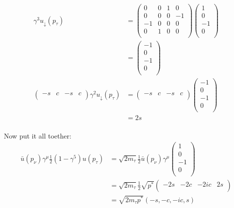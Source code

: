 \begin{align*}
    \gamma^3 u_\downarrow(p_\tau) &= \begin{pmatrix}
        0 & 0 & 1 & 0 \\
        0 & 0 & 0 & -1 \\
        -1 & 0 & 0 & 0 \\
        0 & 1 & 0 & 0 \\
    \end{pmatrix}\begin{pmatrix}
        1 \\ 0 \\ -1 \\ 0 \\
    \end{pmatrix}\\
    &= \begin{pmatrix}
        -1 \\
        0 \\
        -1 \\
        0 \\
    \end{pmatrix}\\
    \begin{pmatrix}
        -s & c & -s & c \\
    \end{pmatrix} \gamma^2 u_\downarrow(p_\tau) &= \begin{pmatrix}
        -s & c & -s & c \\
    \end{pmatrix}\begin{pmatrix}
        -1 \\
        0 \\
        -1 \\
        0 \\
    \end{pmatrix}\\
    &= 2s\\
\end{align*}

Now put it all toether:
\begin{align*}
    \bar{u}(p_\nu)\gamma^\mu\frac{1}{2}(1-\gamma^5) u(p_\tau)
    &= \sqrt{2m_\tau}\frac{1}{2}\bar{u}(p_\nu) \gamma^\mu\begin{pmatrix}
        1 \\
        0 \\
        -1 \\
        0 \\
    \end{pmatrix} \\
    &= \sqrt{2m_\tau}\frac{1}{2}\sqrt{p^*}\begin{pmatrix}
        -2s &
        -2c &
        -2ic &
        2s \\
    \end{pmatrix} \\
    &= \sqrt{2 m_\tau p^*}(-s, -c, -ic, s)\\
\end{align*}


